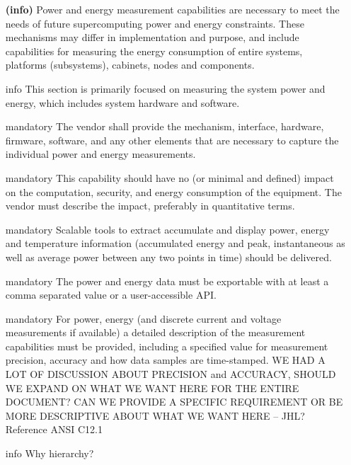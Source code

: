 \begin{itemize}
\item[{\textbf{(info)}}]
Power and energy measurement capabilities are necessary to meet the needs of future 
supercomputing power and energy constraints. These mechanisms may differ in implementation 
and purpose, and include capabilities for measuring the energy consumption of entire systems, 
platforms (subsystems), cabinets, nodes and components.  

\item[{info}]
This section is primarily focused on measuring the system power and energy, which includes system hardware and software.  

\item[{mandatory}]
The vendor shall provide the mechanism, interface, hardware, firmware, software, and any other elements that are necessary to capture the individual power and energy measurements. 

\item[{mandatory}]
This capability should have no (or minimal and defined) impact on the computation, security, and energy consumption of the equipment.  The vendor must describe the impact, preferably in quantitative terms.  

\item[{mandatory}]
Scalable tools to extract accumulate and display power, energy and temperature information (accumulated energy and peak, instantaneous as well as average power between any two points in time) should be delivered.

\item[{mandatory}]
The power and energy data must be exportable with at least a comma separated value or a user-accessible API. 

\item[{mandatory}]
For power, energy (and discrete current and voltage measurements if available) a detailed description of the measurement capabilities must be provided, including a specified value for measurement precision, accuracy and how data samples are time-stamped. WE HAD A LOT OF DISCUSSION ABOUT PRECISION and ACCURACY, SHOULD WE EXPAND ON WHAT WE WANT HERE FOR THE ENTIRE DOCUMENT? CAN WE PROVIDE A SPECIFIC REQUIREMENT OR BE MORE DESCRIPTIVE ABOUT WHAT WE WANT HERE – JHL? Reference ANSI C12.1

\item[{info}]
Why hierarchy?


\end{itemize}
